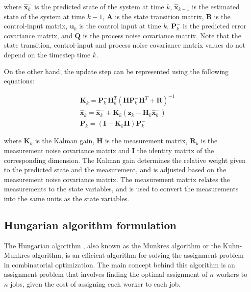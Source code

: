 where $\hat{\mathbf{x}}_k^-$ is the predicted state of the system at time $k$, $\hat{\mathbf{x}}_{k-1}$ is the estimated state of the system at time $k-1$, $\mathbf{A}$ is the state transition matrix, $\mathbf{B}$ is the control-input matrix, $\mathbf{u}_k$ is the control input at time $k$, $\mathbf{P}_k^-$ is the predicted error covariance matrix, and $\mathbf{Q}$ is the process noise covariance matrix. Note that the state transition, control-input and process noise covariance matrix values do not depend on the timestep time $k$.

On the other hand, the update step can be represented using the following equations:

\begin{equation}
	\begin{split}
		\mathbf{K}_k = \mathbf{P}_k^- \mathbf{H}_k^T (\mathbf{H} \mathbf{P}_k^- \mathbf{H}^T + \mathbf{R})^{-1} \\
		\hat{\mathbf{x}}_k = \hat{\mathbf{x}}_k^- + \mathbf{K}_k (\mathbf{z}_k - \mathbf{H}_k \hat{\mathbf{x}}_k^-) \\
		\mathbf{P}_k = (\mathbf{I} - \mathbf{K}_k \mathbf{H}) \mathbf{P}_k^-
	\end{split}
\end{equation}

where $\mathbf{K}_k$ is the Kalman gain, $\mathbf{H}$ is the measurement matrix, $\mathbf{R}_k$ is the measurement noise covariance matrix and $\mathbf{I}$ the identity matrix of the corresponding dimension. The Kalman gain determines the relative weight given to the predicted state and the measurement, and is adjusted based on the measurement noise covariance matrix. The measurement matrix relates the measurements to the state variables, and is used to convert the measurements into the same units as the state variables.

\subsection{Hungarian algorithm formulation}
\label{subsec:3_HA_formulation}

The Hungarian algorithm \cite{kuhn1955hungarian}, also known as the Munkres algorithm or the Kuhn-Munkres algorithm, is an efficient algorithm for solving the assignment problem in combinatorial optimization. The main concept behind this algorithm is an assignment problem that involves finding the optimal assignment of $n$ workers to $n$ jobs, given the cost of assigning each worker to each job.

